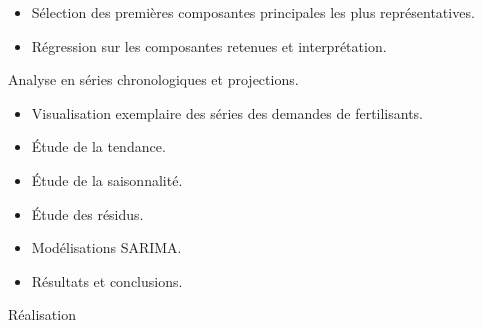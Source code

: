\begin{description}[align=left]
\begin{itemize}
							\item Sélection des premières composantes principales les plus représentatives.
							\item Régression sur les composantes retenues et interprétation.
						\end{itemize} %
		\item[Lot V :] Analyse en séries chronologiques et projections.
						\begin{itemize}
							\item Visualisation exemplaire des séries des demandes de fertilisants.
							\item Étude de la tendance.
							\item Étude de la saisonnalité.
							\item Étude des résidus.
							\item Modélisations SARIMA.
							\item Résultats et conclusions.
						\end{itemize}
		\item[Lot VI :] Réalisation
	\end{description}
